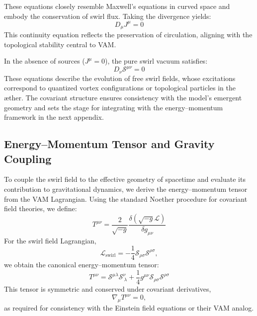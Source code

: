 \documentclass[a4paper,12pt]{article}
\begin{document}
        These equations closely resemble Maxwell's equations in curved space and embody the conservation of swirl flux. Taking the divergence yields:
        \begin{equation}
            D_\mu J^\mu = 0
        \end{equation}
        This continuity equation reflects the preservation of circulation, aligning with the topological stability central to VAM.

        In the absence of sources ($J^\mu = 0$), the pure swirl vacuum satisfies:
        \begin{equation}
            D_\nu \mathcal{S}^{\mu\nu} = 0
        \end{equation}
        These equations describe the evolution of free swirl fields, whose excitations correspond to quantized vortex configurations or topological particles in the æther. The covariant structure ensures consistency with the model's emergent geometry and sets the stage for integrating with the energy–momentum framework in the next appendix.

        \subsection{Energy--Momentum Tensor and Gravity Coupling}
        To couple the swirl field to the effective geometry of spacetime and evaluate its contribution to gravitational dynamics, we derive the energy--momentum tensor from the VAM Lagrangian. Using the standard Noether procedure for covariant field theories, we define:
        \begin{equation}
            T^{\mu\nu} = \frac{2}{\sqrt{-g}} \frac{\delta (\sqrt{-g} \mathcal{L})}{\delta g_{\mu\nu}}
        \end{equation}
        For the swirl field Lagrangian,
        \begin{equation}
            \mathcal{L}_{\text{swirl}} = -\frac{1}{4} \mathcal{S}_{\rho\sigma} \mathcal{S}^{\rho\sigma},
        \end{equation}
        we obtain the canonical energy--momentum tensor:
        \begin{equation}
            T^{\mu\nu} = \mathcal{S}^{\mu\lambda} \mathcal{S}^\nu_{\ \lambda} + \frac{1}{4} g^{\mu\nu} \mathcal{S}_{\rho\sigma} \mathcal{S}^{\rho\sigma}
        \end{equation}
        This tensor is symmetric and conserved under covariant derivatives,
        \begin{equation}
            \nabla_\mu T^{\mu\nu} = 0,
        \end{equation}
        as required for consistency with the Einstein field equations or their VAM analog.
\end{document}
